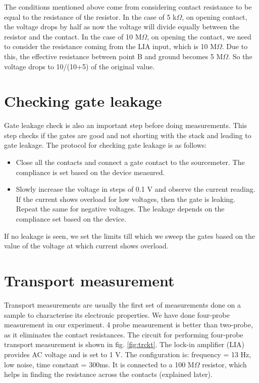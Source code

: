 The conditions mentioned above come from considering contact resistance to be equal to the resistance of the resistor. In the case of 5 k$\Omega$, on opening contact, the voltage drops by half as now the voltage will divide equally between the resistor and the contact. In the case of 10 M$\Omega$, on opening the contact, we need to consider the resistance coming from the LIA input, which is 10 M$\Omega$. Due to this, the effective resistance between point B and ground becomes 5 M$\Omega$. So the voltage drops to 10/(10+5) of the original value.

\section{Checking gate leakage}
\label{section:e}
Gate leakage check is also an important step before doing measurements. This step checks if the gates are good and not shorting with the stack and leading to gate leakage. The protocol for checking gate leakage is as follows:
\begin{itemize}
	\item Close all the contacts and connect a gate contact to the sourcemeter. The compliance is set based on the device measured. 
	\item Slowly increase the voltage in steps of 0.1 V and observe the current reading. If the current shows overload for low voltages, then the gate is leaking. Repeat the same for negative voltages. The leakage depends on the compliance set based on the device.
\end{itemize}

If no leakage is seen, we set the limits till which we sweep the gates based on the value of the voltage at which current shows overload.

\section{Transport measurement}
\label{section:y}
Transport measurements are usually the first set of measurements done on a sample to characterise its electronic properties. We have done four-probe measurement in our experiment. 4 probe measurement is better than two-probe, as it eliminates the contact resistances. The circuit for performing four-probe transport measurement is shown in fig. \ref{fig:trckt}. The lock-in amplifier (LIA) provides AC voltage and is set to 1 V. The configuration is: frequency = 13 Hz, low noise, time constant = 300ms. It is connected to a 100 M$\Omega$ resistor, which helps in finding the resistance across the contacts (explained later).

